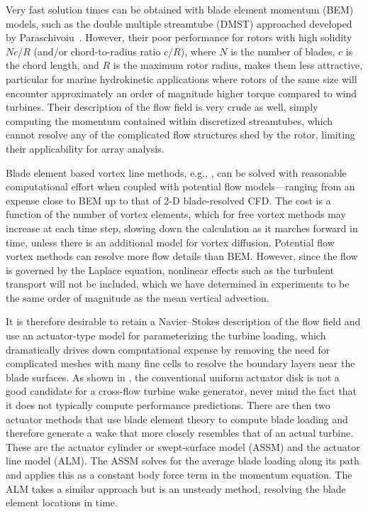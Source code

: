 \documentclass[times]{weauth}
\begin{document}
Very fast solution times can be obtained with blade element momentum (BEM)
models, such as the double multiple streamtube (DMST) approached developed by
Paraschivoiu~\cite{Para1988}. However, their poor performance for rotors with
high solidity~\cite{Joo2015} $Nc/R$ (and/or chord-to-radius ratio $c/R$), where
$N$ is the number of blades, $c$ is the chord length, and $R$ is the maximum
rotor radius, makes them less attractive, particular for marine hydrokinetic
applications where rotors of the same size will encounter approximately an order
of magnitude higher torque compared to wind turbines. Their description of the
flow field is very crude as well, simply computing the momentum contained within
discretized streamtubes, which cannot resolve any of the complicated flow
structures shed by the rotor, limiting their applicability for array analysis.

Blade element based vortex line methods, e.g., \cite{Strickland1981,
Murray2011}, can be solved with reasonable computational effort when coupled
with potential flow models---ranging from an expense close to BEM up to that of
2-D blade-resolved CFD. The cost is a function of the number of vortex elements,
which for free vortex methods may increase at each time step, slowing down the
calculation as it marches forward in time, unless there is an additional model
for vortex diffusion. Potential flow vortex methods can resolve more flow
details than BEM. However, since the flow is governed by the Laplace equation,
nonlinear effects such as the turbulent transport will not be included, which we
have determined in experiments to be the same order of magnitude as the mean
vertical advection.

It is therefore desirable to retain a Navier--Stokes description of the flow
field and use an actuator-type model for parameterizing the turbine loading,
which dramatically drives down computational expense by removing the need for
complicated meshes with many fine cells to resolve the boundary layers near the
blade surfaces. As shown in \cite{Bachant2015-JoT}, the conventional uniform
actuator disk is not a good candidate for a cross-flow turbine wake generator,
never mind the fact that it does not typically compute performance predictions.
There are then two actuator methods that use blade element theory to compute
blade loading and therefore generate a wake that more closely resembles that of
an actual turbine. These are the actuator cylinder or swept-surface model (ASSM)
and the actuator line model (ALM). The ASSM solves for the average blade loading
along its path and applies this as a constant body force term in the momentum
equation. The ALM takes a similar approach but is an unsteady method, resolving
the blade element locations in time.
\end{document}
